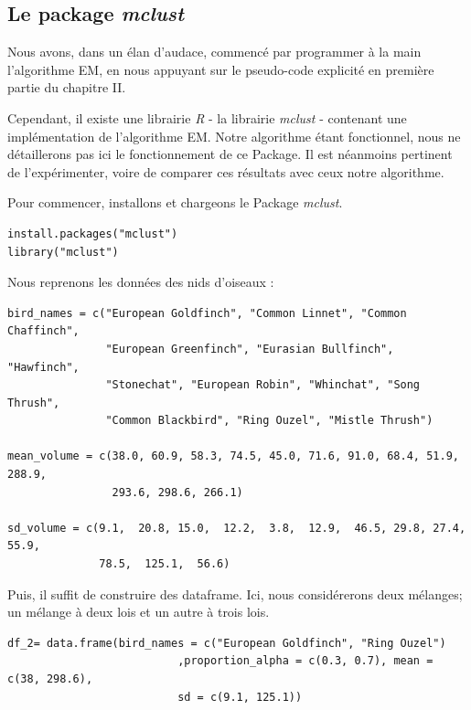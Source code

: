 \documentclass[frenchb]{report}
\newcommand{\1}{\mathbbm{1}}
\theoremstyle{definition}\newtheorem{defn}{Définition}
\theoremstyle{definition}\newtheorem{exm}{Exemple}
\theoremstyle{definition}\newtheorem{nota}{Notation}
\theoremstyle{definition}\newtheorem{rem}{Remarque}
\begin{document}
\begin{appendices}
\chapter{Le package \textit{mclust}}
Nous avons, dans un élan d'audace, commencé par programmer à la main l'algorithme EM, en nous appuyant sur le pseudo-code explicité en première partie du chapitre II. \newline

Cependant, il existe une librairie \textit{R} - la librairie \textit{mclust} - contenant une implémentation de l'algorithme EM. Notre algorithme étant fonctionnel, nous ne détaillerons pas ici le fonctionnement de ce Package. Il est néanmoins pertinent de l'expérimenter, voire de comparer ces résultats avec ceux notre algorithme.

Pour commencer, installons et chargeons le Package \textit{mclust}.
\begin{lstlisting}
install.packages("mclust")
library("mclust")
\end{lstlisting}
%
Nous reprenons les données des nids d'oiseaux :
\begin{lstlisting}
bird_names = c("European Goldfinch", "Common Linnet", "Common Chaffinch",
               "European Greenfinch", "Eurasian Bullfinch", "Hawfinch",
               "Stonechat", "European Robin", "Whinchat", "Song Thrush",
               "Common Blackbird", "Ring Ouzel", "Mistle Thrush")

mean_volume = c(38.0, 60.9, 58.3, 74.5, 45.0, 71.6, 91.0, 68.4, 51.9, 288.9,
                293.6, 298.6, 266.1)

sd_volume = c(9.1,  20.8, 15.0,  12.2,  3.8,  12.9,  46.5, 29.8, 27.4, 55.9,
              78.5,  125.1,  56.6)
\end{lstlisting}
%
Puis, il suffit de construire des dataframe. Ici, nous considérerons deux mélanges; un mélange à deux lois et un autre à trois lois.
\begin{lstlisting}
df_2= data.frame(bird_names = c("European Goldfinch", "Ring Ouzel")
                          ,proportion_alpha = c(0.3, 0.7), mean = c(38, 298.6),
                          sd = c(9.1, 125.1))


\end{lstlisting}
\end{appendices}
\end{document}
